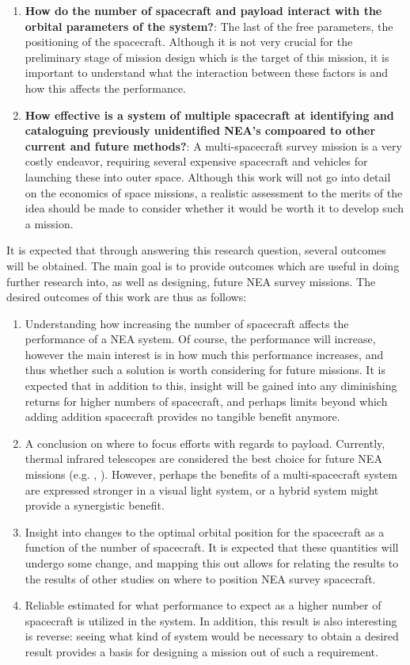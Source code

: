 \begin{enumerate}
 \item \textbf{How do the number of spacecraft and payload interact with the orbital parameters of the system?}: The last of the free parameters, the positioning of the spacecraft. Although it is not very crucial for the preliminary stage of mission design which is the target of this mission, it is important to understand what the interaction between these factors is and how this affects the performance.
 \item \textbf{How effective is a system of multiple spacecraft at identifying and cataloguing previously unidentified NEA's compoared to other current and future methods?}: A multi-spacecraft survey mission is a very costly endeavor, requiring several expensive spacecraft and vehicles for launching these into outer space. Although this work will not go into detail on the economics of space missions, a realistic assessment to the merits of the idea should be made to consider whether it would be worth it to develop such a mission. 
\end{enumerate}

It is expected that through answering this research question, several outcomes will be obtained. The main goal is to provide outcomes which are useful in doing further research into, as well as designing, future NEA survey missions. The desired outcomes of this work are thus as follows:
\begin{enumerate}
 \item Understanding how increasing the number of spacecraft affects the performance of a NEA system. Of course, the performance will increase, however the main interest is in how much this performance increases, and thus whether such a solution is worth considering for future missions. It is expected that in addition to this, insight will be gained into any diminishing returns for higher numbers of spacecraft, and perhaps limits beyond which adding addition spacecraft provides no tangible benefit anymore.
 \item A conclusion on where to focus efforts with regards to payload. Currently, thermal infrared telescopes are considered the best choice for future NEA missions (e.g. \cite{2017NEOSDT}, \cite{ThesisOlga}). However, perhaps the benefits of a multi-spacecraft system are expressed stronger in a visual light system, or a hybrid system might provide a synergistic benefit.
 \item Insight into changes to the optimal orbital position for the spacecraft as a function of the number of spacecraft. It is expected that these quantities will undergo some change, and mapping this out allows for relating the results to the results of other studies on where to position NEA survey spacecraft.
 \item Reliable estimated for what performance to expect as a higher number of spacecraft is utilized in the system. In addition, this result is also interesting is reverse: seeing what kind of system would be necessary to obtain a desired result provides a basis for designing a mission out of such a requirement.
\end{enumerate}

